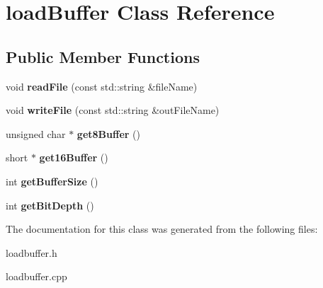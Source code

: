 \hypertarget{classloadBuffer}{}\section{load\+Buffer Class Reference}
\label{classloadBuffer}
\subsection*{Public Member Functions}
\begin{DoxyCompactItemize}
\item 
\mbox{\label{classloadBuffer_adfdc981dd37280f382467ecd6fb087c6}} 
void {\bfseries read\+File} (const std\+::string \&file\+Name)
\item 
\mbox{\label{classloadBuffer_a0ebc8576784119627232cff763100695}} 
void {\bfseries write\+File} (const std\+::string \&out\+File\+Name)
\item 
\mbox{\label{classloadBuffer_ace04b355c2b23c72abd1d322dcb960ee}} 
unsigned char $\ast$ {\bfseries get8\+Buffer} ()
\item 
\mbox{\label{classloadBuffer_aa6b14cb999de76cfce307f7036310859}} 
short $\ast$ {\bfseries get16\+Buffer} ()
\item 
\mbox{\label{classloadBuffer_afdb86606188438cef499304c2a0af433}} 
int {\bfseries get\+Buffer\+Size} ()
\item 
\mbox{\label{classloadBuffer_aa4d8b0a75f4459dc0f255f62d822e14b}} 
int {\bfseries get\+Bit\+Depth} ()
\end{DoxyCompactItemize}


The documentation for this class was generated from the following files\+:\begin{DoxyCompactItemize}
\item 
loadbuffer.\+h\item 
loadbuffer.\+cpp\end{DoxyCompactItemize}
